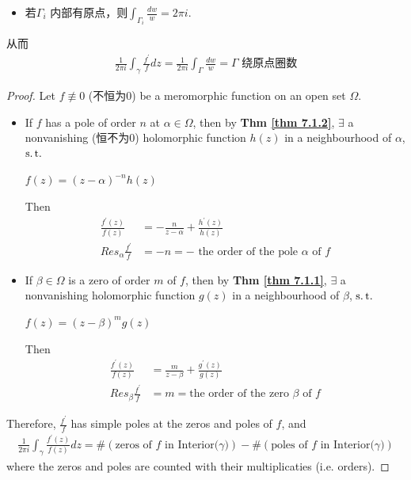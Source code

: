 \begin{thm}
\begin{rmk}
\begin{itemize}
				\item 若$\Gamma_i$ 内部有原点，则$\int_{\Gamma_i}{\frac{dw}{w}} = 2 \pi i$.
			\end{itemize}
			从而
			\begin{align}
				\frac{1}{2 \pi i} \int_{\gamma}{\frac{f^{'}}{f} dz}
				= \frac{1}{2 \pi i} \int_{\Gamma}{\frac{dw}{w}}
				= \text{$\Gamma$ 绕原点圈数}
			\end{align}
		\end{rmk}
	
		\newpage
		
		\begin{proof}
			Let $f \not\equiv 0$ (不恒为0) be a meromorphic function on an open set $\Omega$. 
			
			\vspace{2em}
			
			\begin{itemize}
				\item If $f$ has a pole of order $n$ at $\alpha \in \Omega$, then by \textbf{Thm \ref{thm 7.1.2}}, $\exists$ a nonvanishing (恒不为0) holomorphic function $h(z)$ in a neighbourhood of $\alpha$, $\operatorname{s.t.}$
				\begin{center}
					$f(z) = (z - \alpha)^{-n} h(z)$
				\end{center}
				Then
				\begin{align}
					\frac{f^{'}(z)}{f(z)} &= -\frac{n}{z - \alpha} + \frac{h^{'}(z)}{h(z)} \\
					Res_{\alpha}\frac{f^{'}}{f} &= -n = - \,\, \text{the order of the pole $\alpha$ of $f$}
				\end{align}
				
				\vspace{2em}
				
				\item If $\beta \in \Omega$ is a zero of order $m$ of $f$, then by \textbf{Thm \ref{thm 7.1.1}}, $\exists$ a nonvanishing holomorphic function $g(z)$ in a neighbourhood of $\beta$, $\operatorname{s.t.}$
				\begin{center}
					$f(z) = (z - \beta)^{m} g(z)$
				\end{center}
				Then
				\begin{align}
					\frac{f^{'}(z)}{f(z)} &= \frac{m}{z - \beta} + \frac{g^{'}(z)}{g(z)} \\
					Res_{\beta}\frac{f^{'}}{f} &= m = \text{the order of the zero $\beta$ of $f$}
				\end{align}
			\end{itemize}
			
			\vspace{2em}
			
			Therefore, $\frac{f^{'}}{f}$ has simple poles at the zeros and poles of $f$, and
			\begin{align}
				\frac{1}{2 \pi i} \int_{\gamma}{\frac{f^{'}(z)}{f(z)} dz}
				= \# \left( \text{zeros of $f$ in Interior($\gamma$)} \right) - \# \left( \text{poles of $f$ in Interior($\gamma$)} \right)
			\end{align}
			where the zeros and poles are counted with their multiplicaties (i.e. orders).
		\end{proof}
	\end{thm}

